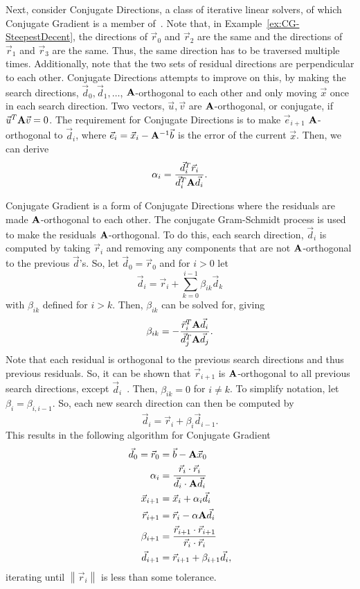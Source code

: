 Next, consider Conjugate Directions, a class of iterative linear solvers, of which Conjugate Gradient is a member of~\cite{Shewchuk:1994:IntroToCG}.
Note that, in Example~\ref{ex:CG-SteepestDecent}, the directions of \(\vec{r}_0\) and \(\vec{r}_2\) are the same and the directions of \(\vec{r}_1\) and \(\vec{r}_3\) are the same.
Thus, the same direction has to be traversed multiple times.
Additionally, note that the two sets of residual directions are perpendicular to each other.
Conjugate Directions attempts to improve on this, by making the search directions, \(\vec{d}_0, \vec{d}_1, \dots\), \(\mathbf{A}\)-orthogonal to each other and only moving \(\vec{x}\) once in each search direction.
Two vectors, \(\vec{u}, \vec{v}\) are \(\mathbf{A}\)-orthogonal, or conjugate, if \(\vec{u}^T\mathbf{A}\vec{v}=0\).
The requirement for Conjugate Directions is to make \(\vec{e}_{i+1}\) \(\mathbf{A}\)-orthogonal to \(\vec{d}_i\), where \(\vec{e}_i = \vec{x}_i - \mathbf{A}^{-1}\vec{b}\) is the error of the current \(\vec{x}\).
Then, we can derive
\[
	\alpha_i = \frac{\vec{d}_i^T\vec{r}_i}{\vec{d}_i^T\mathbf{A}\vec{d}_i}.
\]

Conjugate Gradient is a form of Conjugate Directions where the residuals are made \(\mathbf{A}\)-orthogonal to each other.
The conjugate Gram-Schmidt process is used to make the residuals \(\mathbf{A}\)-orthogonal.
To do this, each search direction, \(\vec{d}_i\) is computed by taking \(\vec{r}_i\) and removing any components that are not \(\mathbf{A}\)-orthogonal to the previous \(\vec{d}\)'s.
So, let \(\vec{d}_0 = \vec{r}_0\) and for \(i > 0\) let
\[
	\vec{d}_i = \vec{r}_i + \sum_{k=0}^{i-1} \beta_{ik}\vec{d}_k
\]
with \(\beta_{ik}\) defined for \(i > k\).
Then, \(\beta_{ik}\) can be solved for, giving
\[
	\beta_{ik} = -\frac{\vec{r}_i^T\mathbf{A}\vec{d}_i}{\vec{d}_j^T\mathbf{A}\vec{d}_j}.
\]
Note that each residual is orthogonal to the previous search directions and thus previous residuals.
So, it can be shown that \(\vec{r}_{i+1}\) is \(\mathbf{A}\)-orthogonal to all previous search directions, except \(\vec{d}_i\)~\cite{Shewchuk:1994:IntroToCG}.
Then, \(\beta_{ik} = 0\) for \(i \neq k\).
To simplify notation, let \(\beta_i = \beta_{i,i-1}\).
So, each new search direction can then be computed by
\[
	\vec{d}_i = \vec{r}_i + \beta_i\vec{d}_{i-1}.
\]
This results in the following algorithm for Conjugate Gradient
\begin{align*}
	\vec{d}_0 = \vec{r}_0 &= \vec{b} - \mathbf{A}\vec{x}_0 \\
	\alpha_i &= \frac{\vec{r}_i\cdot\vec{r}_i}{\vec{d}_i\cdot \mathbf{A}\vec{d}_i} \\
	\vec{x}_{i+1} &= \vec{x}_i + \alpha_i\vec{d}_i \\
	\vec{r}_{i+1} &= \vec{r}_i - \alpha\mathbf{A}\vec{d}_i \\
	\beta_{i+1} &= \frac{\vec{r}_{i+1}\cdot\vec{r}_{i+1}}{\vec{r}_i\cdot\vec{r}_i} \\
	\vec{d}_{i+1} &= \vec{r}_{i+1} + \beta_{i+1}\vec{d}_i,
\end{align*}
iterating until \(\left\|\vec{r}_i\right\|\) is less than some tolerance.

